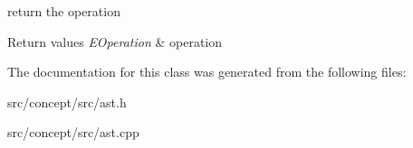 return the operation 


\begin{DoxyRetVals}{Return values}
{\em E\-Operation} & operation \\
\hline
\end{DoxyRetVals}


The documentation for this class was generated from the following files\-:\begin{DoxyCompactItemize}
\item 
src/concept/src/ast.\-h\item 
src/concept/src/ast.\-cpp\end{DoxyCompactItemize}

